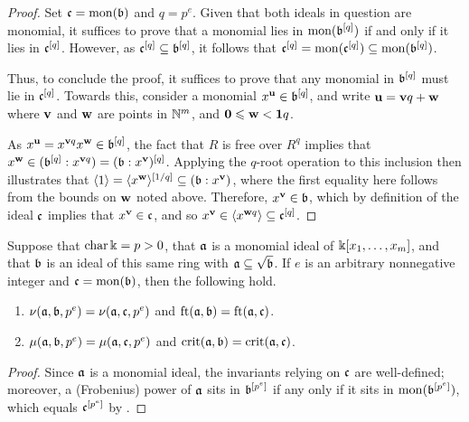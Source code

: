 \documentclass[11pt]{amsart}
\begin{document}
\begin{proof}  Set $\mathfrak{c} = \operatorname{mon}(\mathfrak{b})$ and $q=p^e$.  Given that both ideals in question are monomial, it suffices to prove that a monomial lies in $\operatorname{mon}(\mathfrak{b}^{[q]})$ if and only if it lies in $\mathfrak{c}^{[q]}$.  However, as $\mathfrak{c}^{[q]} \subseteq \mathfrak{b}^{[q]}$, it follows that
$\mathfrak{c}^{[q]} = \operatorname{mon}(\mathfrak{c}^{[q]}) \subseteq \operatorname{mon}(\mathfrak{b}^{[q]})$.

Thus, to conclude the proof, it suffices to prove that any monomial in $\mathfrak{b}^{[q]}$ must lie in $\mathfrak{c}^{[q]}$.  Towards this, consider a monomial $x^{\mathbf{u}} \in \mathfrak{b}^{[q]}$, and write $\mathbf{u} = \mathbf{v}q + \mathbf{w}$ where $\mathbf{v}$ and $\mathbf{w}$ are points in $\mathbb{N}^m$, and $\mathbf{0} \leqslant \mathbf{w} < \mathbf{1}q$.

As $x^{\mathbf{u}} = x^{\mathbf{v}q} x^{\mathbf{w}} \in \mathfrak{b}^{[q]}$, the fact that $R$ is free over $R^q$ implies that $x^{\mathbf{w}} \in ( \mathfrak{b}^{[q]}: x^{\mathbf{v}q}) = (\mathfrak{b}:x^{\mathbf{v}})^{[q]}$.  Applying the $q$-root operation to this inclusion then illustrates that $\langle 1 \rangle = \langle x^{\mathbf{w}} \rangle^{[1/q]}  \subseteq (\mathfrak{b}: x^{\mathbf{v}})$,  where the first equality here follows from the bounds on $\mathbf{w}$ noted above.   Therefore, $x^{\mathbf{v}} \in \mathfrak{b}$, which by definition of the ideal $\mathfrak{c}$ implies that $x^{\mathbf{v}} \in \mathfrak{c}$, and so $x^{\mathbf{v}} \in \langle x^{\mathbf{w}q} \rangle \subseteq \mathfrak{c}^{[q]}$.
\end{proof}


\begin{corollary}
\label{reduce-to-monomial-case: C}
Suppose that $\operatorname{char} \Bbbk = p > 0$, that $\mathfrak{a}$ is a monomial ideal of $\Bbbk[x_1, \ldots, x_m]$, and that $\mathfrak{b}$ is an ideal of this same ring with $\mathfrak{a} \subseteq \sqrt{\mathfrak{b}}$.  If $e$ is an arbitrary nonnegative integer and $\mathfrak{c} = \operatorname{mon}(\mathfrak{b})$, then the following hold.
\begin{enumerate}
\item $\nu(\mathfrak{a}, \mathfrak{b}, p^e) = \nu(\mathfrak{a}, \mathfrak{c}, p^e)$ and $\operatorname{ft}(\mathfrak{a}, \mathfrak{b}) = \operatorname{ft}(\mathfrak{a}, \mathfrak{c})$.
\item $\mu(\mathfrak{a}, \mathfrak{b}, p^e) = \mu(\mathfrak{a}, \mathfrak{c}, p^e)$ and $\operatorname{crit}(\mathfrak{a},\mathfrak{b}) = \operatorname{crit}(\mathfrak{a},\mathfrak{c})$. 
\end{enumerate}
\end{corollary}


\begin{proof}
Since $\mathfrak{a}$ is a monomial ideal, the invariants relying on $\mathfrak{c}$ are well-defined; moreover, 
a (Frobenius) power of $\mathfrak{a}$ sits in $\mathfrak{b}^{[p^e]}$ if any only if it sits in $\operatorname{mon}(\mathfrak{b}^{[p^e]})$, which equals
$\mathfrak{c}^{[p^e]}$ by .
 \end{proof}
\end{document}
